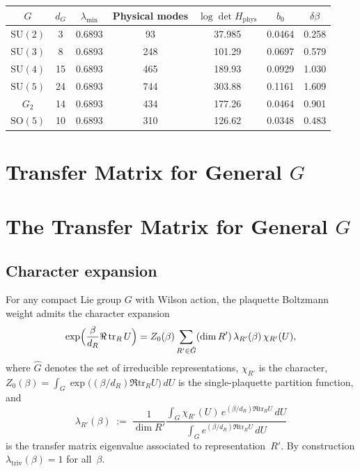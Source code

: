 \documentclass[11pt]{article}
\theoremstyle{definition}
\newcommand{\SU}{\mathrm{SU}}
\newcommand{\tr}{\mathrm{tr}}
\newcommand{\SO}{\mathrm{SO}}
\begin{document}
\begin{center}
\renewcommand{\arraystretch}{1.2}
\begin{tabular}{@{}ccccccc@{}}
\toprule
$G$ & $d_G$ & $\lambda_{\min}$ & Physical modes &
$\log\det H_{\mathrm{phys}}$ & $b_0$ & $\delta\beta$ \\
\midrule
$\SU(2)$ & 3 & 0.6893 & 93 & 37.985 & 0.0464 & 0.258 \\
$\SU(3)$ & 8 & 0.6893 & 248 & 101.29 & 0.0697 & 0.579 \\
$\SU(4)$ & 15 & 0.6893 & 465 & 189.93 & 0.0929 & 1.030 \\
$\SU(5)$ & 24 & 0.6893 & 744 & 303.88 & 0.1161 & 1.609 \\
$G_2$ & 14 & 0.6893 & 434 & 177.26 & 0.0464 & 0.901 \\
$\SO(5)$ & 10 & 0.6893 & 310 & 126.62 & 0.0348 & 0.483 \\
\bottomrule
\end{tabular}
\end{center}


\section{Transfer Matrix for General $G$}\label{sec:transfer-general}

\section{The Transfer Matrix for General $G$}
\label{sun-sec:transfer}

\subsection{Character expansion}

For any compact Lie group $G$ with Wilson action,
the plaquette Boltzmann weight admits the character
expansion
\begin{equation}\label{sun-eq:character}
\exp\Bigl(\frac{\beta}{d_R}\Re\,\tr_R\,U\Bigr)
=Z_0(\beta)\sum_{R'\in\hat{G}}(\dim R')\,
\lambda_{R'}(\beta)\,\chi_{R'}(U),
\end{equation}
where $\hat{G}$ denotes the set of irreducible
representations, $\chi_{R'}$ is the character,
$Z_0(\beta)=\int_G\exp\bigl((\beta/d_R)\Re\tr_R U\bigr)
\,dU$ is the single-plaquette partition function, and
\begin{equation}\label{sun-eq:eigenvalue}
\lambda_{R'}(\beta)
\;:=\;\frac{1}{\dim R'}
\frac{\int_G\chi_{R'}(U)\,
e^{(\beta/d_R)\Re\tr_R U}\,dU}
{\int_G e^{(\beta/d_R)\Re\tr_R U}\,dU}
\end{equation}
is the transfer matrix eigenvalue associated to
representation~$R'$.  By construction
$\lambda_{\text{triv}}(\beta)=1$ for all~$\beta$.
\end{document}
